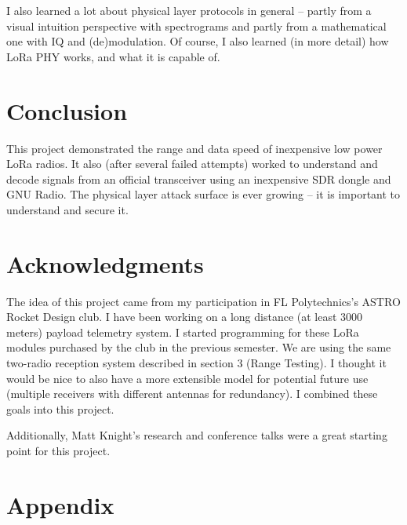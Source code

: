 \documentclass[conference, compsoc]{IEEEtran}
\begin{document}
I also learned a lot about physical layer protocols in general -- partly from a visual intuition perspective with spectrograms and partly from a mathematical one with IQ and (de)modulation. Of course, I also learned (in more detail) how LoRa PHY works, and what it is capable of.

\section{Conclusion}
This project demonstrated the range and data speed of inexpensive low power LoRa radios. It also (after several failed attempts) worked to understand and decode signals from an official transceiver using an inexpensive SDR dongle and GNU Radio. The physical layer attack surface is ever growing -- it is important to understand and secure it.

\newpage %

\section{Acknowledgments}
The idea of this project came from my participation in FL Polytechnics's ASTRO Rocket Design club. I have been working on a long distance (at least 3000 meters) payload telemetry system. I started programming for these LoRa modules purchased by the club in the previous semester. We are using the same two-radio reception system described in section 3 (Range Testing). I thought it would be nice to also have a more extensible model for potential future use (multiple receivers with different antennas for redundancy). I combined these goals into this project.

Additionally, Matt Knight's research and conference talks were a great starting point for this project.




\clearpage
\section*{Appendix}
\end{document}
